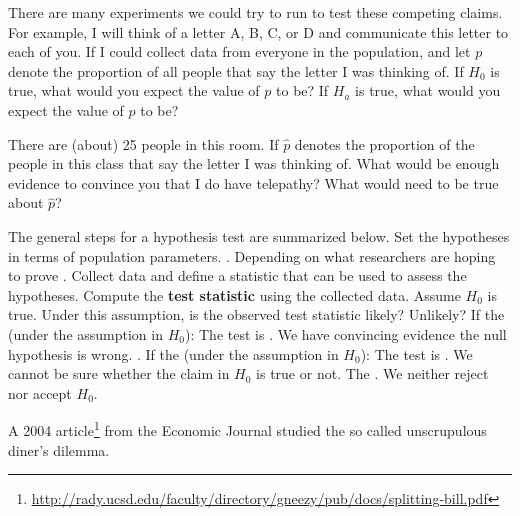\ii There are many experiments we could try to run to test these competing claims. For example, I will think of a letter A, B, C, or D and communicate this letter to each of you. If I could collect data from everyone in the population, and let $p$ denote the proportion of all people that say the letter I was thinking of. If $H_0$ is true, what would you expect the value of $p$ to be? If $H_a$ is true, what would you expect the value of $p$ to be?  \vfill


\ii There are (about) 25 people in this room. If $\hat{p}$ denotes the proportion of the people in this class that say the letter I was
thinking of. What would be enough evidence to convince you that I do have telepathy? What would need to be true about $\hat{p}$?
 \vfill
 
\ee

\clearpage


\bbox
The general steps for a hypothesis test are summarized below.
\bi
\ii Set the hypotheses in terms of population parameters. . Depending on what researchers are hoping to prove .
\ii Collect data and define a statistic that can be used to assess the hypotheses. Compute the \textbf{test statistic} using the collected data.
\ii Assume $H_0$ is true. Under this assumption, is the observed test statistic likely? Unlikely?
If the \textbf{} (under the assumption in $H_0$):
\bi
\ii[$\circ$] The test is \textbf{}.
\ii[$\circ$] We have convincing evidence the null hypothesis is wrong.
\ii[$\circ$] \textbf{}.
\ei
\ii If the \textbf{} (under the assumption in $H_0$):
\bi
\ii[$\circ$] The test is \textbf{}.
\ii[$\circ$] We cannot be sure whether the claim in $H_0$ is true or not.
\ii[$\circ$] The \textbf{}. We neither reject nor accept $H_0$.
\ei
\ei
\ebox


\bb[resume]
\ii A 2004 article\footnote{\href{http://rady.ucsd.edu/faculty/directory/gneezy/pub/docs/splitting-bill.pdf}{\underline{http://rady.ucsd.edu/faculty/directory/gneezy/pub/docs/splitting-bill.pdf}}} from the Economic Journal studied the so called unscrupulous diner’s dilemma.  

